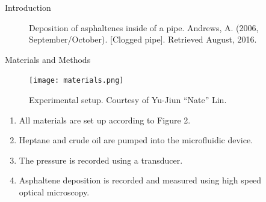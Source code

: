 \documentclass[final]{beamer}
\newlength{\sepwid}
\newlength{\onecolwid}
\newlength{\twocolwid}
\begin{document}
\begin{frame}[t, fragile]
\begin{columns}[t]
\begin{column}{\onecolwid}
\begin{block}{Introduction}
\end{block}


\begin{figure}
\caption{Deposition of asphaltenes inside of a pipe. Andrews, A. (2006, September/October). [Clogged pipe]. Retrieved August, 2016.}
\end{figure}


\begin{block}{Materials and Methods}

\begin{figure}
\texttt{[image: materials.png]}
\caption{Experimental setup. Courtesy of Yu-Jiun ``Nate'' Lin.}
\end{figure}

\begin{enumerate}
\item All materials are set up according to Figure 2.
\item Heptane and crude oil are pumped into the microfluidic device.
\item The pressure is recorded using a transducer.
\item Asphaltene deposition is recorded and measured using high speed optical microscopy.
\end{enumerate}

\end{block}


\end{column}						%

\begin{column}{\sepwid}\end{column}	%
\begin{column}{\twocolwid}			%
\begin{columns}[t,totalwidth=\twocolwid]	%
\begin{column}{\onecolwid}\vspace{-.6in}	%


\end{column}
\end{columns}
\end{column}
\end{columns}
\end{frame}
\end{document}
